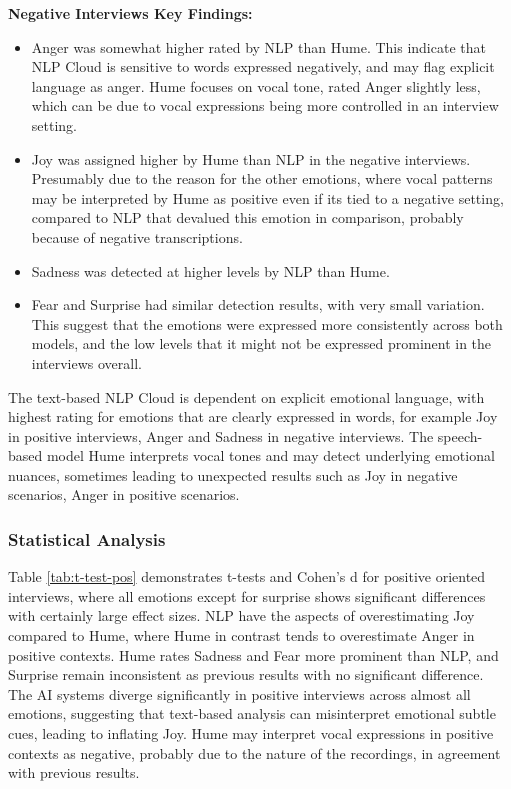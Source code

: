\textbf{Negative Interviews Key Findings: }

\begin{itemize}
    \item Anger was somewhat higher rated by NLP than Hume. This indicate that NLP Cloud is sensitive to words expressed negatively, and may flag explicit language as anger. 
    Hume focuses on vocal tone, rated Anger slightly less, which can be due to vocal expressions being more controlled in an interview setting. 
    \item Joy was assigned higher by Hume than NLP in the negative interviews. Presumably due to the reason for the other emotions, where vocal patterns may be interpreted by Hume as positive even if its tied to a negative setting, 
    compared to NLP that devalued this emotion in comparison, probably because of negative transcriptions. 
    \item Sadness was detected at higher levels by NLP than Hume. 
    \item Fear and Surprise had similar detection results, with very small variation. This suggest that the emotions were expressed more consistently across both models, and the low levels that it might not be expressed prominent in the interviews overall. 
\end{itemize}

The text-based NLP Cloud is dependent on explicit emotional language, with highest rating for emotions that are clearly 
expressed in words, for example Joy in positive interviews, Anger and Sadness in negative interviews. 
The speech-based model Hume interprets vocal tones and may detect underlying emotional nuances, sometimes leading to unexpected results such 
as Joy in negative scenarios, Anger in positive scenarios. 

\subsubsection{Statistical Analysis}

Table \ref{tab:t-test-pos} demonstrates t-tests and Cohen's d for positive oriented interviews, where all emotions except for surprise shows significant differences 
with certainly large effect sizes. NLP have the aspects of overestimating Joy compared to Hume, where Hume in contrast tends to overestimate Anger in positive contexts. 
Hume rates Sadness and Fear more prominent than NLP, and Surprise remain inconsistent as previous results with no significant difference. 
The AI systems diverge significantly in positive interviews across almost all emotions, suggesting that text-based analysis can misinterpret 
emotional subtle cues, leading to inflating Joy. Hume may interpret vocal expressions in positive contexts as negative, probably due to the nature of the recordings, 
in agreement with previous results. 

